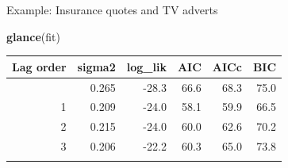 \documentclass[
  14pt,
  ignorenonframetext,
  aspectratio=169,
]{beamer}
\newenvironment{Shaded}{\begin{snugshade}}{\end{snugshade}}
\newcommand{\FunctionTok}[1]{\textcolor[rgb]{0.13,0.29,0.53}{\textbf{#1}}}
\newcommand{\NormalTok}[1]{#1}
\newcounter{none} %
\renewenvironment{Shaded}{\vspace*{0.15cm}\color{black}\fontsize{10}{10}\sf\begin{snugshade}\color{black}}{\end{snugshade}}
\begin{document}
\begin{frame}[fragile]{Example: Insurance quotes and TV adverts}
\protect{}\label{example-insurance-quotes-and-tv-adverts-4}
\fontsize{10}{10}\sf

\begin{Shaded}
\begin{Highlighting}[]
\FunctionTok{glance}\NormalTok{(fit)}
\end{Highlighting}
\end{Shaded}

{\def\LTcaptype{none} %
\begin{longtable}[]{@{}rrrrrr@{}}
\toprule\noalign{}
Lag order & sigma2 & log\_lik & AIC & AICc & BIC \\
\midrule\noalign{}
\endhead
0 & 0.265 & -28.3 & 66.6 & 68.3 & 75.0 \\
1 & 0.209 & -24.0 & 58.1 & 59.9 & 66.5 \\
2 & 0.215 & -24.0 & 60.0 & 62.6 & 70.2 \\
3 & 0.206 & -22.2 & 60.3 & 65.0 & 73.8 \\
\bottomrule\noalign{}
\end{longtable}
}
\end{frame}
\end{document}
